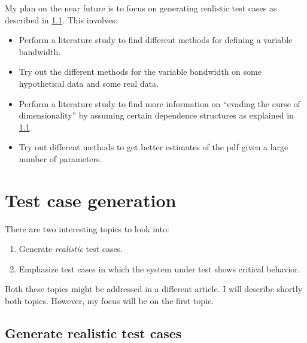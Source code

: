 \documentclass[10pt,final,a4paper,oneside,onecolumn]{article}
\begin{document}
My plan on the near future is to focus on generating realistic test cases as described in \cref{sec:realistic}. This involves:
\begin{itemize}
	\item Perform a literature study to find different methods for defining a variable bandwidth.
	\item Try out the different methods for the variable bandwidth on some hypothetical data and some real data.
	\item Perform a literature study to find more information on ``evading the curse of dimensionality'' by assuming certain dependence structures as explained in \cref{sec:realistic}.
	\item Try out different methods to get better estimates of the pdf given a large number of parameters.
\end{itemize}

\section{Test case generation}
\label{sec:test case generation}

There are two interesting topics to look into:
\begin{enumerate}
	\item Generate \emph{realistic} test cases. 
	\item Emphasize test cases in which the system under test shows critical behavior.
\end{enumerate}

Both these topics might be addressed in a different article. I will describe shortly both topics. However, my focus will be on the first topic.


\subsection{Generate realistic test cases}
\label{sec:realistic}
\end{document}
